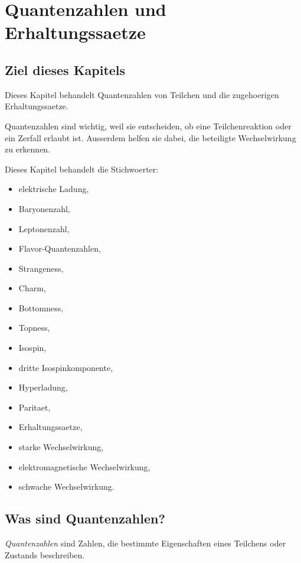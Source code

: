 \chapter{Quantenzahlen und Erhaltungssaetze}

\section{Ziel dieses Kapitels}

Dieses Kapitel behandelt Quantenzahlen von Teilchen und die zugehoerigen
Erhaltungssaetze.

Quantenzahlen sind wichtig, weil sie entscheiden, ob eine Teilchenreaktion oder ein
Zerfall erlaubt ist. Ausserdem helfen sie dabei, die beteiligte Wechselwirkung zu
erkennen.

\begin{notebox}
Dieses Kapitel behandelt die Stichwoerter:
\begin{itemize}
    \item elektrische Ladung,
    \item Baryonenzahl,
    \item Leptonenzahl,
    \item Flavor-Quantenzahlen,
    \item Strangeness,
    \item Charm,
    \item Bottomness,
    \item Topness,
    \item Isospin,
    \item dritte Isospinkomponente,
    \item Hyperladung,
    \item Paritaet,
    \item Erhaltungssaetze,
    \item starke Wechselwirkung,
    \item elektromagnetische Wechselwirkung,
    \item schwache Wechselwirkung.
\end{itemize}
\end{notebox}

\section{Was sind Quantenzahlen?}

\begin{definitionbox}
\emph{Quantenzahlen} sind Zahlen, die bestimmte Eigenschaften eines Teilchens oder
Zustands beschreiben.
\end{definitionbox}

